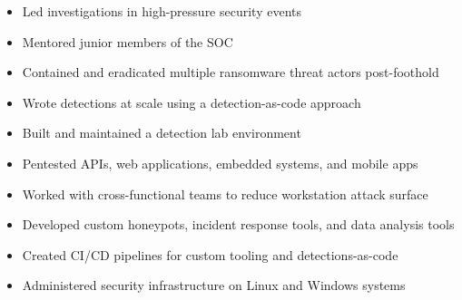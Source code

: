 \documentclass[../../main.tex]{subfiles}
\begin{document}
\begin{itemize}
    \item Led investigations in high-pressure security events
    \item Mentored junior members of the SOC
    \item Contained and eradicated multiple ransomware threat actors post-foothold
    \item Wrote detections at scale using a detection-as-code approach
    \item Built and maintained a detection lab environment
    \item Pentested APIs, web applications, embedded systems, and mobile apps
    \item Worked with cross-functional teams to reduce workstation attack surface
    \item Developed custom honeypots, incident response tools, and data analysis tools
    \item Created CI/CD pipelines for custom tooling and detections-as-code
    \item Administered security infrastructure on Linux and Windows systems
\end{itemize}
\end{document}
